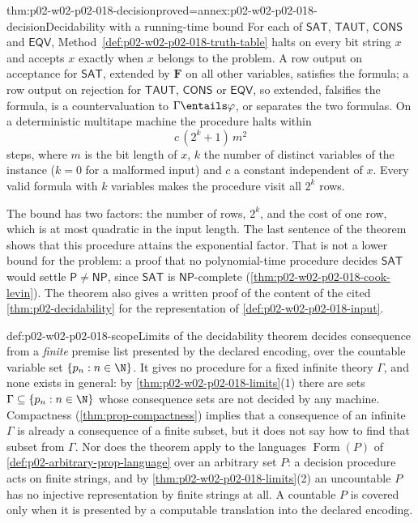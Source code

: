 \begin{hbtheorem}{thm:p02-w02-p02-018-decision}{proved=annex:p02-w02-p02-018-decision}{Decidability with a running-time bound}
For each of \(\mathsf{SAT}\), \(\mathsf{TAUT}\), \(\mathsf{CONS}\) and
\(\mathsf{EQV}\), Method~\ref{def:p02-w02-p02-018-truth-table} halts on every
bit string \(x\) and accepts \(x\) exactly when \(x\) belongs to the problem.
A row output on acceptance for \(\mathsf{SAT}\), extended by \(\mathbf F\) on
all other variables, satisfies the formula; a row output on rejection for
\(\mathsf{TAUT}\), \(\mathsf{CONS}\) or \(\mathsf{EQV}\), so extended,
falsifies the formula, is a countervaluation to
\(\Gamma\entails\varphi\), or separates the two formulas.  On a deterministic
multitape machine the procedure halts within
\[
 c\,(2^{k}+1)\,m^{2}
\]
steps, where \(m\) is the bit length of \(x\), \(k\) the number of distinct
variables of the instance (\(k=0\) for a malformed input) and \(c\) a
constant independent of \(x\).  Every valid formula with \(k\) variables
makes the procedure visit all \(2^{k}\) rows.
\end{hbtheorem}

The bound has two factors: the number of rows, \(2^{k}\), and the cost of one
row, which is at most quadratic in the input length.  The last sentence of
the theorem shows that this procedure attains the exponential factor.  That
is not a lower bound for the problem: a proof that no polynomial-time
procedure decides \(\mathsf{SAT}\) would settle \(\mathsf P\ne\mathsf{NP}\),
since \(\mathsf{SAT}\) is \(\mathsf{NP}\)-complete
(\cref{thm:p02-w02-p02-018-cook-levin}).  The theorem also gives a written
proof of the content of the cited \cref{thm:p02-decidability} for the
representation of \cref{def:p02-w02-p02-018-input}.

\begin{hbwarning}{def:p02-w02-p02-018-scope}{Limits of the decidability theorem}
 decides consequence from a
\emph{finite} premise list presented by the declared encoding, over the
countable variable set \(\{p_n:n\in\N\}\).  It gives no procedure for a fixed
infinite theory \(\Gamma\), and none exists in general: by
\cref{thm:p02-w02-p02-018-limits}(1) there are sets
\(\Gamma\subseteq\{p_n:n\in\N\}\) whose consequence sets are not decided by
any machine.  Compactness (\cref{thm:prop-compactness}) implies that a
consequence of an infinite \(\Gamma\) is already a consequence of a finite
subset, but it does not say how to find that subset from \(\Gamma\).  Nor does the theorem apply to the
languages \(\operatorname{Form}(P)\) of
\cref{def:p02-arbitrary-prop-language} over an arbitrary set \(P\): a
decision procedure acts on finite strings, and by
\cref{thm:p02-w02-p02-018-limits}(2) an uncountable \(P\) has no injective
representation by finite strings at all.  A countable \(P\) is covered only
when it is presented by a computable translation into the declared
encoding.
\end{hbwarning}

